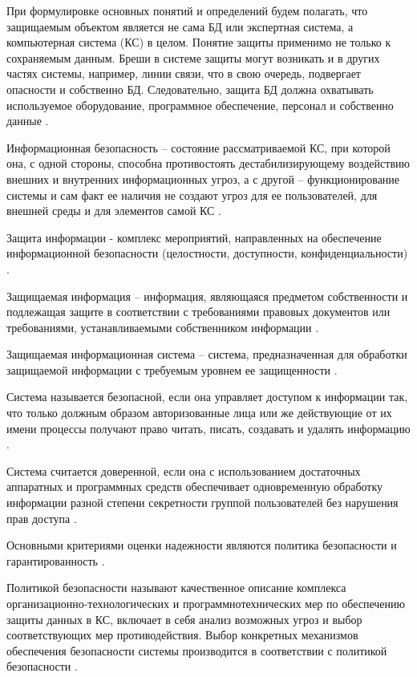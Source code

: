 При формулировке основных понятий и определений будем полагать, что защищаемым объектом является не сама БД или экспертная система, а компьютерная система (КС) в целом. Понятие защиты применимо не только к сохраняемым данным. Бреши в системе защиты могут возникать и в других частях системы, например, линии связи, что в свою очередь, подвергает опасности и собственно БД. Следовательно, защита БД должна охватывать используемое оборудование, программное обеспечение, персонал и собственно данные \autocite[сс. 15-18]{Skakun}. 

Информационная безопасность – состояние рассматриваемой КС, при которой она, с одной стороны, способна противостоять дестабилизирующему воздействию внешних и внутренних информационных угроз, а с другой – функционирование системы и сам факт ее наличия не создают угроз для ее пользователей, для внешней среды и для элементов самой КС \autocite[сс. 15-18]{Skakun}.

Защита информации - комплекс мероприятий, направленных на обеспечение информационной безопасности (целостности, доступности, конфиденциальности) \autocite[сс. 15-18]{Skakun}.

Защищаемая информация – информация, являющаяся предметом собственности и подлежащая защите в соответствии с требованиями правовых документов или требованиями, устанавливаемыми собственником информации \autocite[сс. 15-18]{Skakun}.

Защищаемая информационная система – система, предназначенная для обработки защищаемой информации с требуемым уровнем ее защищенности \autocite[сс. 15-18]{Skakun}.

Система называется безопасной, если она управляет доступом к информации так, что только должным образом авторизованные лица или же действующие от их имени процессы получают право читать, писать, создавать и удалять информацию \autocite[сс. 15-18]{Skakun}. 

Система считается доверенной, если она с использованием достаточных аппаратных и программных средств обеспечивает одновременную обработку информации разной степени секретности группой пользователей без нарушения прав доступа \autocite[сс. 15-18]{Skakun}.

Основными критериями оценки надежности являются политика безопасности и гарантированность \autocite[сс. 15-18]{Skakun}.

Политикой безопасности называют качественное описание комплекса организационно-технологических и программнотехнических мер по обеспечению защиты данных в КС, включает в себя анализ возможных угроз и выбор соответствующих мер противодействия. Выбор конкретных механизмов обеспечения безопасности системы производится в соответствии с политикой безопасности \autocite[сс. 15-18]{Skakun}.

